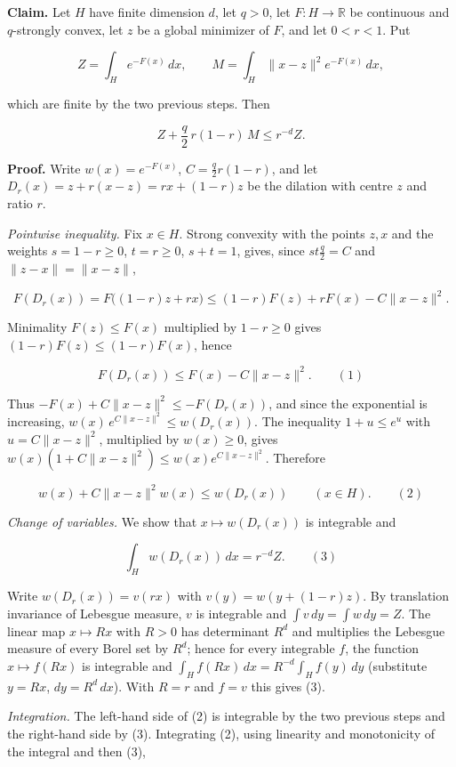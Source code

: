 \documentclass[11pt,a4paper]{article}
\begin{document}
\textbf{Claim.} Let \(H\) have finite dimension \(d\), let \(q>0\), let \(F:H\to\mathbb R\) be continuous and \(q\)-strongly convex, let \(z\) be a global minimizer of \(F\), and let \(0<r<1\). Put


\[Z=\int_He^{-F(x)}\,dx,\qquad M=\int_H\|x-z\|^2e^{-F(x)}\,dx,\]


which are finite by the two previous steps. Then


\[Z+\frac q2\,r(1-r)\,M\le r^{-d}Z.\]


\textbf{Proof.} Write \(w(x)=e^{-F(x)}\), \(C=\frac q2r(1-r)\), and let \(D_r(x)=z+r(x-z)=rx+(1-r)z\) be the dilation with centre \(z\) and ratio \(r\).




\emph{Pointwise inequality.} Fix \(x\in H\). Strong convexity with the points \(z,x\) and the weights \(s=1-r\ge0\), \(t=r\ge0\), \(s+t=1\), gives, since \(st\frac q2=C\) and \(\|z-x\|=\|x-z\|\),


\[F(D_r(x))=F\bigl((1-r)z+rx\bigr)\le(1-r)F(z)+rF(x)-C\|x-z\|^2.\]


Minimality \(F(z)\le F(x)\) multiplied by \(1-r\ge0\) gives \((1-r)F(z)\le(1-r)F(x)\), hence


\[F(D_r(x))\le F(x)-C\|x-z\|^2.\qquad(1)\]


Thus \(-F(x)+C\|x-z\|^2\le-F(D_r(x))\), and since the exponential is increasing, \(w(x)\,e^{C\|x-z\|^2}\le w(D_r(x))\). The inequality \(1+u\le e^u\) with \(u=C\|x-z\|^2\), multiplied by \(w(x)\ge0\), gives \(w(x)(1+C\|x-z\|^2)\le w(x)e^{C\|x-z\|^2}\). Therefore


\[w(x)+C\|x-z\|^2w(x)\le w(D_r(x))\qquad(x\in H).\qquad(2)\]


\emph{Change of variables.} We show that \(x\mapsto w(D_r(x))\) is integrable and


\[\int_Hw(D_r(x))\,dx=r^{-d}Z.\qquad(3)\]


Write \(w(D_r(x))=v(rx)\) with \(v(y)=w(y+(1-r)z)\). By translation invariance of Lebesgue measure, \(v\) is integrable and \(\int v\,dy=\int w\,dy=Z\). The linear map \(x\mapsto Rx\) with \(R>0\) has determinant \(R^d\) and multiplies the Lebesgue measure of every Borel set by \(R^d\); hence for every integrable \(f\), the function \(x\mapsto f(Rx)\) is integrable and \(\int_Hf(Rx)\,dx=R^{-d}\int_Hf(y)\,dy\) (substitute \(y=Rx\), \(dy=R^d\,dx\)). With \(R=r\) and \(f=v\) this gives (3).




\emph{Integration.} The left-hand side of (2) is integrable by the two previous steps and the right-hand side by (3). Integrating (2), using linearity and monotonicity of the integral and then (3),
\end{document}
